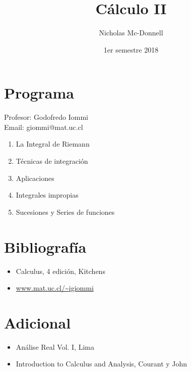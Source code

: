 

\title{Cálculo II}
\author{Nicholas Mc-Donnell}
\date{1er semestre 2018}



    \maketitle

    \newpage
    \hfill
    \newpage
    \section*{Programa}
    {\raggedleft Profesor: Godofredo Iommi}\\
    Email: giommi@mat.uc.cl
    \begin{enumerate}
        \item La Integral de Riemann

        \item Técnicas de integración

        \item Aplicaciones

        \item Integrales impropias

        \item Sucesiones y Series de funciones
    \end{enumerate}

    \section*{Bibliografía}
    \begin{itemize}
        \item Calculus, 4 edición, Kitchens

        \item \url{www.mat.uc.cl/~igiommi}

    \end{itemize}

    \section*{Adicional}
    \begin{itemize}
        \item Análise Real Vol. I, Lima

        \item Introduction to Calculus and Analysis, Courant y John
    \end{itemize}

